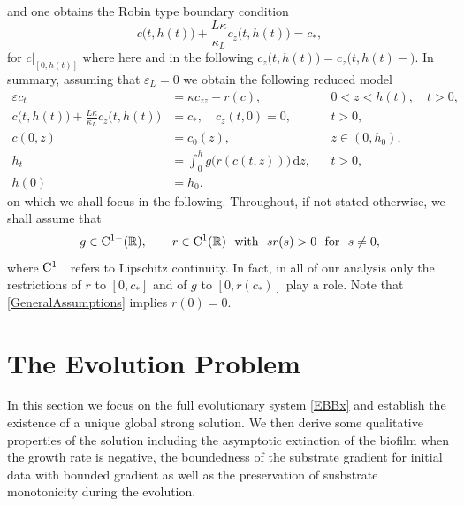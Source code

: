 \documentclass[reqno,11pt]{amsart}
\numberwithin{equation}{section}
\newcommand{\R}{\mathbb{R}}
\newcommand{\rd}{\mathrm{d}}
\begin{document}
and one obtains the Robin type boundary condition
\begin{equation}\label{e1}
c\bigl(t,h(t)\bigr)+\frac{L\kappa}{\kappa_L}c_z\bigl( t,h(t)\bigr)=c_*,
\end{equation}
for $c\big |_{[0,h(t)]}$ where here and in the following
$c_z\bigl(t,h(t)\bigr)=c_z\bigl(t,h(t)-\bigr)$. In summary, assuming
that $\varepsilon_L=0$ we obtain the following reduced model
\begin{subequations}\label{EBBx}
\begin{align}
\varepsilon c_t&= \kappa c_{zz}-r(c),  &&0<z<h(t),\quad t>0,\label{EBBx2}\\
c\bigl(t,h(t)\bigr)+\frac{L\kappa}{\kappa_L}c_z\bigl(t,h(t)\bigr)&=c_*,\quad
c_z(t,0)=0, &&t>0,\label{EBBx4}\\
c(0,z)&=c_0(z), && z\in (0,h_0),\label{EBBx5}\\
h_t&=\int_0^h g\big(r(c(t,z))\big)\,\rd z,&& t>0,\label{EBBx6}\\
h(0)&=h_0.\label{EBBx7}
\end{align}
 \end{subequations}
on which we shall focus in the following. Throughout, if not stated
otherwise, we shall assume that
\begin{equation}\label{GeneralAssumptions}
g\in {\rm C}^{1-}(\R), \qquad r\in
{\rm C}^{1}(\R)\ \text{ with }\ sr(s)> 0\ \text{ for }\ s\not= 0,
\end{equation}
where ${\rm C}^{1-}$ refers to Lipschitz continuity. In fact, in all of our analysis only the restrictions of $r$ to $[0,c_*]$ and of $g$ to  $[0,r(c_*)]$ play a role. Note that
\eqref{GeneralAssumptions} implies $r(0)=0$.


\section{The Evolution Problem}
In this section we focus on the full evolutionary system
\eqref{EBBx} and establish the existence of a unique
global strong solution. We then derive some qualitative properties of
the solution including the asymptotic extinction of the biofilm when
the growth rate is negative, the boundedness of the substrate
gradient for initial data with bounded gradient as well as the
preservation of susbstrate monotonicity during the evolution.  
\end{document}
